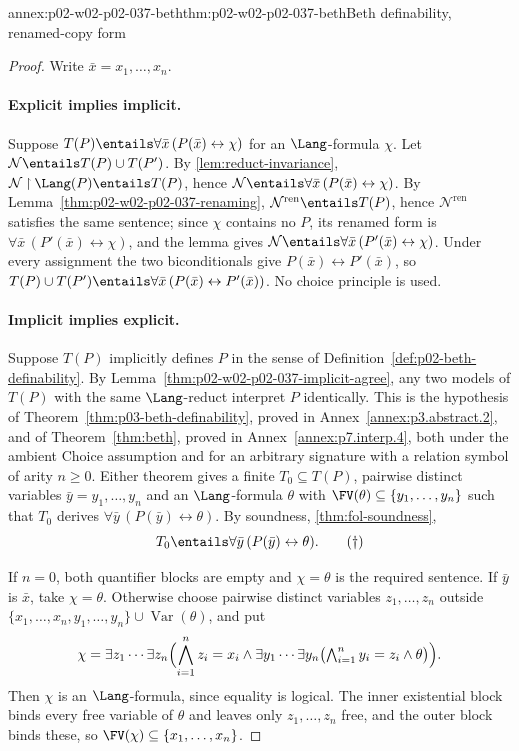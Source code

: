 \begin{annexitem}{annex:p02-w02-p02-037-beth}{thm:p02-w02-p02-037-beth}{Beth definability, renamed-copy form}
\begin{proof}
Write \(\bar x=x_1,\ldots,x_n\).

\paragraph{Explicit implies implicit.}
Suppose \(T(P)\entails\forall\bar x\,(P(\bar x)\leftrightarrow\chi)\) for an
\(\Lang\)-formula \(\chi\).  Let \(\mathcal N\entails T(P)\cup T(P')\).  By
\cref{lem:reduct-invariance}, \(\mathcal N\mathbin{\upharpoonright}\Lang(P)\entails T(P)\),
hence
\(\mathcal N\entails\forall\bar x\,(P(\bar x)\leftrightarrow\chi)\).  By
Lemma~\ref{thm:p02-w02-p02-037-renaming}, \(\mathcal N^{\mathrm{ren}}\entails T(P)\),
hence \(\mathcal N^{\mathrm{ren}}\) satisfies the same sentence; since \(\chi\)
contains no \(P\), its renamed form is
\(\forall\bar x\,(P'(\bar x)\leftrightarrow\chi)\), and the lemma gives
\(\mathcal N\entails\forall\bar x\,(P'(\bar x)\leftrightarrow\chi)\).  Under
every assignment the two biconditionals give
\(P(\bar x)\leftrightarrow P'(\bar x)\), so
\(T(P)\cup T(P')\entails\forall\bar x\,(P(\bar x)\leftrightarrow
P'(\bar x))\).  No choice principle is used.

\paragraph{Implicit implies explicit.}
Suppose \(T(P)\) implicitly defines \(P\) in the sense of
Definition~\ref{def:p02-beth-definability}.  By
Lemma~\ref{thm:p02-w02-p02-037-implicit-agree}, any two models of \(T(P)\)
with the same \(\Lang\)-reduct interpret \(P\) identically.  This is the
hypothesis of Theorem~\ref{thm:p03-beth-definability}, proved in
Annex~\ref{annex:p3.abstract.2}, and of Theorem~\ref{thm:beth}, proved in
Annex~\ref{annex:p7.interp.4}, both under the ambient Choice assumption and
for an arbitrary signature with a relation symbol of arity \(n\geq0\).
Either theorem gives a finite \(T_0\subseteq T(P)\), pairwise distinct
variables \(\bar y=y_1,\ldots,y_n\) and an \(\Lang\)-formula \(\theta\) with
\(\FV(\theta)\subseteq\{y_1,\ldots,y_n\}\) such that \(T_0\) derives
\(\forall\bar y\,(P(\bar y)\leftrightarrow\theta)\).  By soundness,
\cref{thm:fol-soundness},
\[
 T_0\entails\forall\bar y\,(P(\bar y)\leftrightarrow\theta).
 \tag{\(\dagger\)}
\]

If \(n=0\), both quantifier blocks are empty and \(\chi=\theta\) is the
required sentence.  If \(\bar y\) is \(\bar x\), take \(\chi=\theta\).
Otherwise choose pairwise distinct variables \(z_1,\ldots,z_n\) outside
\(\{x_1,\ldots,x_n,y_1,\ldots,y_n\}\cup\operatorname{Var}(\theta)\), and put
\[
 \chi=\exists z_1\cdots\exists z_n
 \Bigl(\bigwedge_{i=1}^{n}z_i=x_i\land
 \exists y_1\cdots\exists y_n
 \bigl(\textstyle\bigwedge_{i=1}^{n}y_i=z_i\land\theta\bigr)\Bigr).
\]
Then \(\chi\) is an \(\Lang\)-formula, since equality is logical.  The inner
existential block binds every free variable of \(\theta\) and leaves only
\(z_1,\ldots,z_n\) free, and the outer block binds these, so
\(\FV(\chi)\subseteq\{x_1,\ldots,x_n\}\).


\end{proof}
\end{annexitem}
